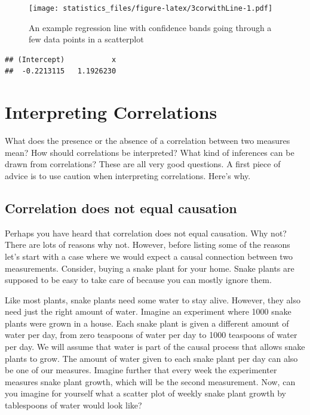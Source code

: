 \documentclass[]{book}
\begin{document}
\begin{figure}
\centering
\texttt{[image: statistics\_files/figure-latex/3corwithLine-1.pdf]}
\caption{\label{fig:3corwithLine}An example regression line with confidence bands going through a few data points in a scatterplot}
\end{figure}

\begin{verbatim}
## (Intercept)           x 
##  -0.2213115   1.1926230
\end{verbatim}

\hypertarget{interpreting-correlations}{%
\section{Interpreting Correlations}\label{interpreting-correlations}}

What does the presence or the absence of a correlation between two measures mean? How should correlations be interpreted? What kind of inferences can be drawn from correlations? These are all very good questions. A first piece of advice is to use caution when interpreting correlations. Here's why.

\hypertarget{correlation-does-not-equal-causation}{%
\subsection{Correlation does not equal causation}\label{correlation-does-not-equal-causation}}

Perhaps you have heard that correlation does not equal causation. Why not? There are lots of reasons why not. However, before listing some of the reasons let's start with a case where we would expect a causal connection between two measurements. Consider, buying a snake plant for your home. Snake plants are supposed to be easy to take care of because you can mostly ignore them.

Like most plants, snake plants need some water to stay alive. However, they also need just the right amount of water. Imagine an experiment where 1000 snake plants were grown in a house. Each snake plant is given a different amount of water per day, from zero teaspoons of water per day to 1000 teaspoons of water per day. We will assume that water is part of the causal process that allows snake plants to grow. The amount of water given to each snake plant per day can also be one of our measures. Imagine further that every week the experimenter measures snake plant growth, which will be the second measurement. Now, can you imagine for yourself what a scatter plot of weekly snake plant growth by tablespoons of water would look like?
\end{document}
